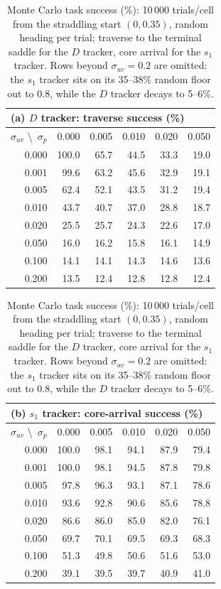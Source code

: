 \documentclass[lettersize,journal]{IEEEtran}
\begin{document}
\begin{table}[!t]
\centering
\caption{Monte Carlo task success (\%): 10\,000 trials/cell from the
straddling start $(0, 0.35)$, random heading per trial; traverse to
the terminal saddle for the $D$ tracker, core arrival for the $s_1$
tracker. Rows beyond $\sigma_{uv} = 0.2$ are omitted: the $s_1$
tracker sits on its 35--38\% random floor out to 0.8, while the $D$
tracker decays to 5--6\%.}
\label{tab:mc_success}
\footnotesize
\setlength{\tabcolsep}{4pt}
\begin{tabular}{r|rrrrr}
\multicolumn{6}{l}{(a) $D$ tracker: traverse success (\%)} \\
\hline
$\sigma_{uv}$ \textbackslash\ $\sigma_p$ & 0.000 & 0.005 & 0.010 & 0.020 & 0.050 \\
\hline
0.000 & 100.0 & 65.7 & 44.5 & 33.3 & 19.0 \\
0.001 &  99.6 & 63.2 & 45.6 & 32.9 & 19.1 \\
0.005 &  62.4 & 52.1 & 43.5 & 31.2 & 19.4 \\
0.010 &  43.7 & 40.7 & 37.0 & 28.8 & 18.7 \\
0.020 &  25.5 & 25.7 & 24.3 & 22.6 & 17.0 \\
0.050 &  16.0 & 16.2 & 15.8 & 16.1 & 14.9 \\
0.100 &  14.1 & 14.1 & 14.3 & 14.6 & 13.6 \\
0.200 &  13.5 & 12.4 & 12.8 & 12.8 & 12.4 \\
\hline
\end{tabular}
\hspace{1.5em}
\begin{tabular}{r|rrrrr}
\multicolumn{6}{l}{(b) $s_1$ tracker: core-arrival success (\%)} \\
\hline
$\sigma_{uv}$ \textbackslash\ $\sigma_p$ & 0.000 & 0.005 & 0.010 & 0.020 & 0.050 \\
\hline
0.000 & 100.0 & 98.1 & 94.1 & 87.9 & 79.4 \\
0.001 & 100.0 & 98.1 & 94.5 & 87.8 & 79.8 \\
0.005 &  97.8 & 96.3 & 93.1 & 87.1 & 78.6 \\
0.010 &  93.6 & 92.8 & 90.6 & 85.6 & 78.8 \\
0.020 &  86.6 & 86.0 & 85.0 & 82.0 & 76.1 \\
0.050 &  69.7 & 70.1 & 69.5 & 69.3 & 68.3 \\
0.100 &  51.3 & 49.8 & 50.6 & 51.6 & 53.0 \\
0.200 &  39.1 & 39.5 & 39.7 & 40.9 & 41.0 \\
\hline
\end{tabular}
\end{table}
\end{document}
